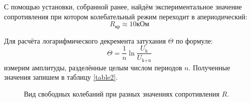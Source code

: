\documentclass[a4paper, 12pt, twoside]{article}
\begin{document}
С помощью установки, собранной ранее, найдём экспериментальное значение сопротивления при котором колебательный режим переходит в апериодический:$$R_{\text{кр}} \approx 10 \text{кОм}$$ 

Для расчёта логарифмического декремента затухания $\Theta$ по формуле:
\begin{equation}
\label{form4}
\Theta = \frac{1}{n}\ln{\frac{U_{\text{k}}}{U_{\text{k+n}}}}
\end{equation}
измерим амплитуды, разделённые целым числом периодов $n$. Полученные значения запишем в таблицу \ref{table2}.

\begin{figure}[H]
	\centering
	\begin{minipage}[h]{0.49\linewidth}
	\end{minipage}
	\begin{minipage}[h]{0.49\linewidth}
	\end{minipage}
	
	\caption{Вид свободных колебаний при разных значениях сопротивления $R$.}
	\label{ris:image1}
\end{figure}
\end{document}

